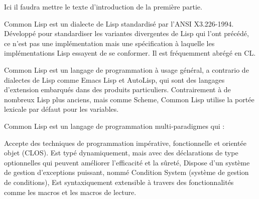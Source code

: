 Ici il faudra mettre le texte d'introduction de la première partie.

Common Lisp est un dialecte de Lisp standardisé par l'ANSI X3.226-1994. Développé pour standardiser les variantes divergentes de Lisp qui l'ont précédé, ce n'est pas une implémentation mais une spécification à laquelle les implémentations Lisp essayent de se conformer. Il est fréquemment abrégé en CL.

Common Lisp est un langage de programmation à usage général, a contrario de dialectes de Lisp comme Emacs Lisp et AutoLisp, qui sont des langages d'extension embarqués dans des produits particuliers. Contrairement à de nombreux Lisp plus anciens, mais comme Scheme, Common Lisp utilise la portée lexicale par défaut pour les variables.

Common Lisp est un langage de programmation multi-paradigmes qui :

Accepte des techniques de programmation impérative, fonctionnelle et orientée objet (CLOS).
Est typé dynamiquement, mais avec des déclarations de type optionnelles qui peuvent améliorer l'efficacité et la sûreté,
Dispose d'un système de gestion d'exceptions puissant, nommé Condition System (système de gestion de conditions),
Est syntaxiquement extensible à travers des fonctionnalités comme les macros et les macros de lecture.